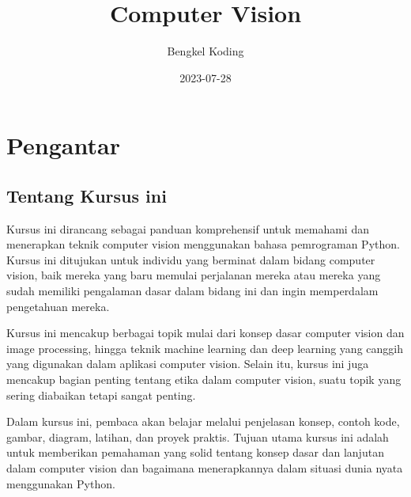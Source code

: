 \documentclass[
  letterpaper,
  DIV=11,
  numbers=noendperiod]{scrreprt}
\title{Computer Vision}
\author{Bengkel Koding}
\date{2023-07-28}
\renewcommand*\contentsname{Table of contents}
\newcommand\contentsname{Table of contents}
\begin{document}
\maketitle
\ifdefined\Shaded\renewenvironment{Shaded}{\begin{tcolorbox}[breakable, enhanced, borderline west={3pt}{0pt}{shadecolor}, frame hidden, boxrule=0pt, interior hidden, sharp corners]}{\end{tcolorbox}}\fi

\renewcommand*\contentsname{Table of contents}
{
\hypersetup{linkcolor=}
\setcounter{tocdepth}{2}
\tableofcontents
}

\hypertarget{pengantar}{%
\chapter*{\texorpdfstring{\textbf{Pengantar}}{Pengantar}}\label{pengantar}}


\hypertarget{tentang-kursus-ini}{%
\section*{Tentang Kursus ini}\label{tentang-kursus-ini}}


Kursus ini dirancang sebagai panduan komprehensif untuk memahami dan
menerapkan teknik computer vision menggunakan bahasa pemrograman Python.
Kursus ini ditujukan untuk individu yang berminat dalam bidang computer
vision, baik mereka yang baru memulai perjalanan mereka atau mereka yang
sudah memiliki pengalaman dasar dalam bidang ini dan ingin memperdalam
pengetahuan mereka.

Kursus ini mencakup berbagai topik mulai dari konsep dasar computer
vision dan image processing, hingga teknik machine learning dan deep
learning yang canggih yang digunakan dalam aplikasi computer vision.
Selain itu, kursus ini juga mencakup bagian penting tentang etika dalam
computer vision, suatu topik yang sering diabaikan tetapi sangat
penting.

Dalam kursus ini, pembaca akan belajar melalui penjelasan konsep, contoh
kode, gambar, diagram, latihan, dan proyek praktis. Tujuan utama kursus
ini adalah untuk memberikan pemahaman yang solid tentang konsep dasar
dan lanjutan dalam computer vision dan bagaimana menerapkannya dalam
situasi dunia nyata menggunakan Python.
\end{document}
